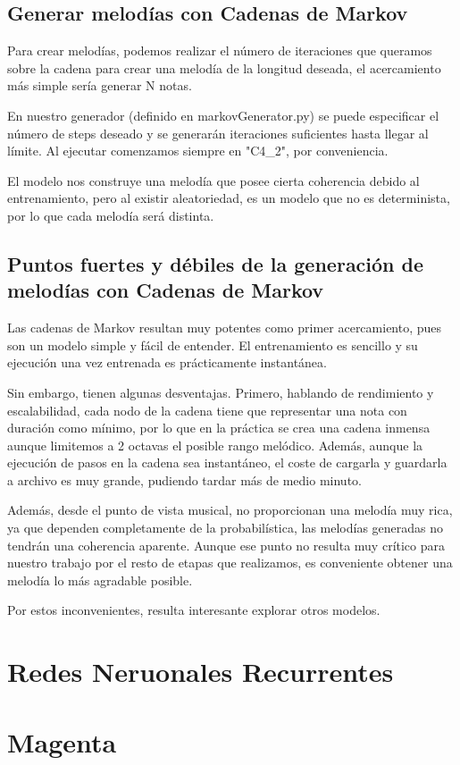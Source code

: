     \subsection{Generar melodías con Cadenas de Markov}
    \label{subsec:generarCadenasMarkov}
    Para crear melodías, podemos realizar el número de iteraciones que queramos sobre la cadena para crear una melodía de la longitud deseada, el acercamiento más simple sería generar N notas. 
    
    En nuestro generador (definido en markovGenerator.py) se puede especificar el número de steps deseado y se generarán iteraciones suficientes hasta llegar al límite. Al ejecutar comenzamos siempre en "C4\_2", por conveniencia.

    El modelo nos construye una melodía que posee cierta coherencia debido al entrenamiento, pero al existir aleatoriedad, es un modelo que no es determinista, por lo que cada melodía será distinta.

    \subsection{Puntos fuertes y débiles de la generación de melodías con Cadenas de Markov}
    \label{subsec:ventajasYDesventajasMarkov}
    Las cadenas de Markov resultan muy potentes como primer acercamiento, pues son un modelo simple y fácil de entender. El entrenamiento es sencillo y su ejecución una vez entrenada es prácticamente instantánea.

    Sin embargo, tienen algunas desventajas. Primero, hablando de rendimiento y escalabilidad, cada nodo de la cadena tiene que representar una nota con duración como mínimo, por lo que en la práctica se crea una cadena inmensa aunque limitemos a 2 octavas el posible rango melódico. Además, aunque la ejecución de pasos en la cadena sea instantáneo, el coste de cargarla y guardarla a archivo es muy grande, pudiendo tardar más de medio minuto.

    Además, desde el punto de vista musical, no proporcionan una melodía muy rica, ya que dependen completamente de la probabilística, las melodías generadas no tendrán una coherencia aparente. Aunque ese punto no resulta muy crítico para nuestro trabajo por el resto de etapas que realizamos, es conveniente obtener una melodía lo más agradable posible.

    Por estos inconvenientes, resulta interesante explorar otros modelos.

\section{Redes Neruonales Recurrentes}
\label{sec:RNR}

\section{Magenta}
\label{sec:magenta}